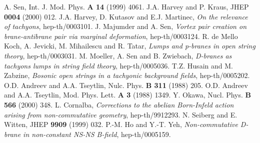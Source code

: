 \documentclass[a4paper,12pt]{article}
\begin{document}
\begin{thebibliography}{99}
A. Sen, Int. J. Mod. Phys. {\bf A 14} (1999) 4061.
J.A. Harvey and P. Kraus, JHEP {\bf 0004} (2000) 012.
J.A. Harvey, D. Kutasov and E.J. Martinec, {\it On the relevance of
tachyons}, hep-th/0003101.
J. Majumder and A. Sen, {\it Vortex pair creation on brane-antibrane
pair via marginal deformation}, hep-th/0003124.
R. de Mello Koch, A. Jevicki, M. Mihailescu and R. Tatar,
{\it Lumps and p-branes in open string theory}, hep-th/0003031.
M. Moeller, A. Sen and B. Zwiebach, {\it D-branes as tachyons lumps
in string field theory}, hep-th/0005036.
T.Z. Husain and M. Zabzine, {\it Bosonic open strings in a tachyonic
background fields}, hep-th/0005202.
O.D. Andreev and A.A. Tseytlin, Nulc. Phys. {\bf B 311} (1988) 205.
O.D. Andreev and A.A. Tseytlin, Mod. Phys. Lett. {\bf A 3} (1988) 1349.
Y. Okawa, Nucl. Phys. {\bf B 566} (2000) 348.
L. Cornalba, {\it Corrections to the abelian Born-Infeld action
arising from non-commutative geometry}, hep-th/9912293.
N. Seiberg and E. Witten, JHEP {\bf 9909} (1999) 032.
P.-M. Ho and Y.-T. Yeh, {\it Non-commutative D-brane in non-constant
NS-NS B-field}, hep-th/0005159.
\end{thebibliography}
\end{document}
